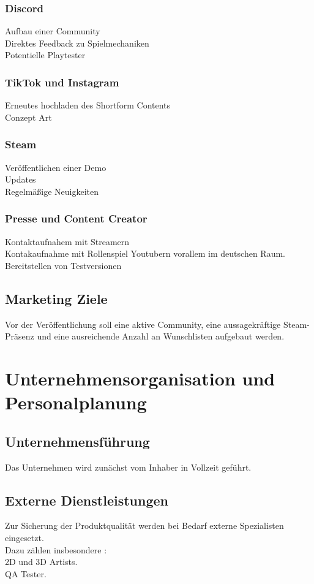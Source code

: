 \documentclass[envcountsame,envcountchap deutsch]{i-studis}
\begin{document}
\subsection{Discord}
Aufbau einer Community \\
Direktes Feedback zu Spielmechaniken \\
Potentielle Playtester \\
\subsection{TikTok und Instagram}
Erneutes hochladen des Shortform Contents \\
Conzept Art \\

\subsection{Steam}
Veröffentlichen einer Demo \\
Updates \\
Regelmäßige Neuigkeiten \\
\subsection{Presse und Content Creator}

Kontaktaufnahem mit Streamern
\\ Kontakaufnahme mit Rollenspiel Youtubern vorallem im deutschen Raum.
\\ Bereitstellen von Testversionen
\section{Marketing Ziele}
 Vor der Veröffentlichung soll eine aktive Community, eine aussagekräftige Steam-Präsenz und eine ausreichende Anzahl an Wunschlisten aufgebaut werden. 
 


\chapter{Unternehmensorganisation und Personalplanung}
\section{Unternehmensführung}
Das Unternehmen wird zunächst vom Inhaber in Vollzeit geführt.
\section{Externe Dienstleistungen}
Zur Sicherung der Produktqualität werden bei Bedarf externe Spezialisten eingesetzt.\\
Dazu zählen insbesondere : \\
2D und 3D Artists. \\
QA Tester. \\
\end{document}
